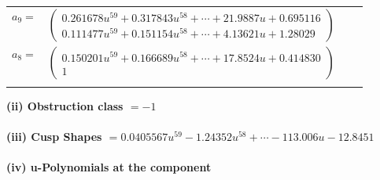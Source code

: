 \documentclass[1p]{elsarticle_modified}
\theoremstyle{definition}
\begin{document}
\begin{tabular}{m{7pt} m{180pt} m{7pt} m{180pt} }
\flushright $a_{9}=$&$\begin{pmatrix}0.261678 u^{59}+0.317843 u^{58}+\cdots+21.9887 u+0.695116\\0.111477 u^{59}+0.151154 u^{58}+\cdots+4.13621 u+1.28029\end{pmatrix}$ \\
\flushright $a_{8}=$&$\begin{pmatrix}0.150201 u^{59}+0.166689 u^{58}+\cdots+17.8524 u+0.414830\\1\end{pmatrix}$\\&\end{tabular}
\flushleft \textbf{(ii) Obstruction class $= -1$}\\~\\
\flushleft \textbf{(iii) Cusp Shapes $= 0.0405567 u^{59}-1.24352 u^{58}+\cdots-113.006 u-12.8451$}\\~\\
\newpage\renewcommand{\arraystretch}{1}
\flushleft \textbf{(iv) u-Polynomials at the component}\newline \\
\end{document}

